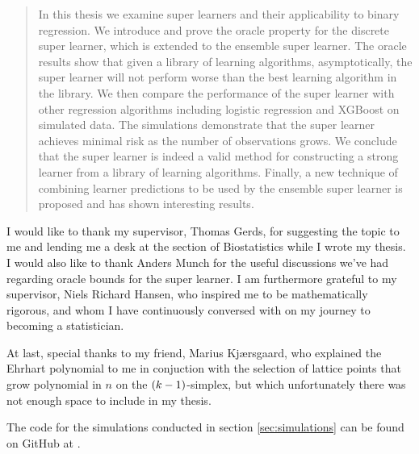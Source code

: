 \vspace{\fill}
\begin{abstract}
In this thesis we examine super learners and their applicability to binary regression. We introduce and prove the oracle property for the discrete super learner, which is extended to the ensemble super learner. The oracle results show that given a library of learning algorithms, asymptotically, the super learner will not perform worse than the best learning algorithm in the library. We then compare the performance of the super learner with other regression algorithms including logistic regression and XGBoost on simulated data. The simulations demonstrate that the super learner achieves minimal risk as the number of observations grows. We conclude that the super learner is indeed a valid method for constructing a strong learner from a library of learning algorithms. Finally, a new technique of combining learner predictions to be used by the ensemble super learner is proposed and has shown interesting results. 
\end{abstract}
\vspace{\fill}
\begin{acknowledgements}
   I would like to thank my supervisor, Thomas Gerds, for suggesting the topic to me and lending me a desk at the section of Biostatistics while I wrote my thesis. I would also like to thank Anders Munch for the useful discussions we've had regarding oracle bounds for the super learner. I am furthermore grateful to my supervisor, Niels Richard Hansen, who inspired me to be mathematically rigorous, and whom I have continuously conversed with on my journey to becoming a statistician.

   At last, special thanks to my friend, Marius Kjærsgaard, who explained the Ehrhart polynomial to me in conjuction with the selection of lattice points that grow polynomial in $ n $ on the $ (k-1) $-simplex, but which unfortunately there was not enough space to include in my thesis. 
\end{acknowledgements}
\vspace{\fill}
\begin{codeavailability}
    The code for the simulations conducted in section \ref{sec:simulations} can be found on GitHub at \parencite{github}.
\end{codeavailability}
\vspace{\fill}

